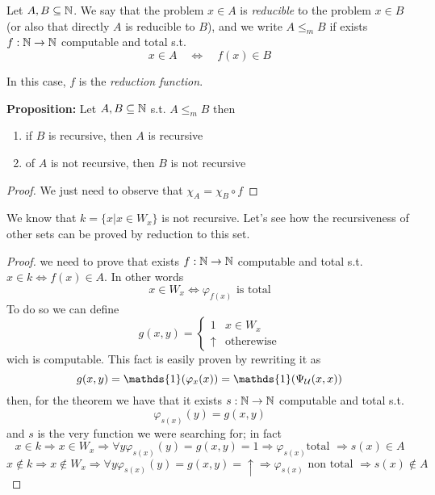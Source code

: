\newcommand{\red}{\ensuremath{\leq_m}}
\begin{definition}
  Let $A,B \subseteq \mathbb{N}$. We say that the problem $x \in A$ is
  \emph{reducible} to the problem $x \in B$ (or also that directly $A$
  is reducible to $B$), and we write $A \red B$ if exists
  $f : \mathbb{N} \rightarrow \mathbb{N}$ computable and total s.t.
  \[x \in A \quad  \Leftrightarrow \quad f(x) \in B\]
\end{definition}
In this case, $f$ is the \emph{reduction function}.

\textbf{Proposition:} Let $A,B \subseteq \mathbb{N}$ s.t. $A \red B$ then
\begin{enumerate}[label=\arabic*)]
\item if $B$ is recursive, then $A$ is recursive
\item of $A$ is not recursive, then $B$ is not recursive
\end{enumerate}

\begin{proof}
We just need to observe that $\chi_A = \chi_B \circ f$
\end{proof}

We know that $k = \{ x | x \in W_x \}$ is not recursive. Let's see how
the recursiveness of other sets can be proved by reduction to this
set.
\begin{example}
  \begin{proof}
    we need to prove that exists $f : \mathbb{N} \rightarrow \mathbb{N}$ computable and total
    s.t. $x \in k \Leftrightarrow f(x) \in A$. In other words
    \[ x\in W_x \Leftrightarrow  \varphi_{f(x)} \mbox{ is total} \]
    To do so we can define
    \[
      g(x,y) = \begin{cases}
        1 & x\in W_x \\
        \uparrow & \mbox{otherewise} 
      \end{cases}
    \]
    wich is computable. This fact is easily proven by rewriting it as
    \[
      g(x,y) = \mathds{1}(\varphi_x(x)) = \mathds{1}(\univ(x,x))
    \]
    then, for the \smn theorem we have that it exists $s: \mathbb{N} \rightarrow \mathbb{N}$
    computable and total s.t. \[\varphi_{s(x)}(y) = g(x,y)\] and $s$
    is the very function we were searching for; in fact
    \[x \in k \Rightarrow x \in W_x \Rightarrow \forall y
      \varphi_{s(x)}(y) = g(x,y) = 1 \Rightarrow \varphi_{s(x)} \mbox{
        total } \Rightarrow s(x) \in A\]
    \[x \notin k \Rightarrow x \notin W_x \Rightarrow \forall y
      \varphi_{s(x)}(y) = g(x,y) = \uparrow \Rightarrow \varphi_{s(x)}
      \mbox{ non total } \Rightarrow s(x) \notin A\]
  \end{proof}
\end{example}

